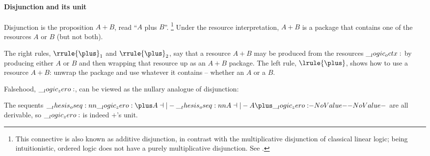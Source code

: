 \paragraph{Disjunction and its unit}
Disjunction is the proposition $A \plus B$, read \enquote{$A$ plus $B$}.%
\footnote{This connective is also known as additive disjunction, in contrast with the multiplicative disjunction of classical linear logic; being intuitionistic, ordered logic does not have a purely multiplicative disjunction.
  See \textcite{Chang+:CMU03}.}
Under the resource interpretation, $A \plus B$ is a package that contains one of the resources $A$ or $B$
(but not both).
The right rules, $\rrule{\plus}_1$ and $\rrule{\plus}_2$, say that a resource $A \plus B$ may be produced from the resources $\__logic_octx:$ by producing either $A$ or $B$ and then wrapping that resource up as an $A \plus B$ package.
The left rule, $\lrule{\plus}$, shows how to use a resource $A \plus B$: unwrap the package and use whatever it contains -- whether an $A$ or a $B$.

Falsehood, $\__logic_zero:$, can be viewed as the nullary analogue of disjunction:
The sequents $\oseq{\zero \plus A \dashv|- \oseq{A \dashv|- A \plus \zero}}$ are all derivable, so $\__logic_zero:$ is indeed $\plus$'s unit.

